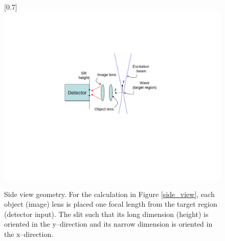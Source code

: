 \begin{figure}
\scalebox{0.7}[0.7]{
\includegraphics[bb=80 230 489 450]
{side_view_figure/side_view_figure.pdf}
}
\caption[Side view geometry]{Side view geometry. For the calculation in Figure \ref{side_view}, each object (image) lens is placed one focal length from the target region (detector input). The slit such that its long dimension (height) is oriented in the y--direction and its narrow dimension is oriented in the x--direction.}
\label{side_view_figure}
\end{figure}
